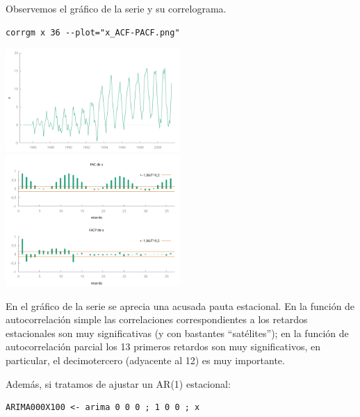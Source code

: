 \documentclass[10pt]{article}
\begin{document}
Observemos el gráfico de la serie y su correlograma.

\begin{verbatim}
corrgm x 36 --plot="x_ACF-PACF.png"
\end{verbatim}


\begin{center}
\includegraphics[width=0.5\textwidth]{./SegundoEjercicioIdentificacionARIMA/SerieEnNiveles.png}
\includegraphics[width=0.5\textwidth]{./SegundoEjercicioIdentificacionARIMA/x_ACF-PACF.png}
\end{center}

En el gráfico de la serie se aprecia una acusada pauta estacional. En
la función de autocorrelación simple las correlaciones
correspondientes a los retardos estacionales son muy significativas (y
con bastantes ``satélites''); en la función de autocorrelación parcial
los 13 primeros retardos son muy significativos, en particular, el
decimotercero (adyacente al 12) es muy importante.

Además, si tratamos de ajustar un AR(1) estacional:

\begin{verbatim}
ARIMA000X100 <- arima 0 0 0 ; 1 0 0 ; x 
\end{verbatim}
\end{document}

